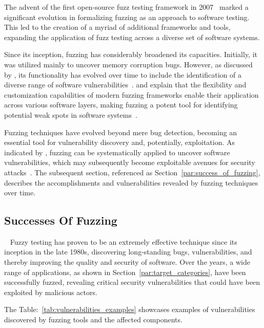 The advent of the first open-source fuzz testing framework in 2007~\cite{takanen2009fuzzing}
marked a significant evolution in formalizing fuzzing as an approach to software testing.
This led to the creation of a myriad of additional frameworks and tools, expanding the
application of fuzz testing across a diverse set of software systems.

Since its inception, fuzzing has considerably broadened its capacities.
Initially, it was utilized mainly to uncover memory corruption bugs. However,
as discussed by , its functionality has
evolved over time to include the identification of a diverse range of
software vulnerabilities~\cite{bohme2020fuzzing}.  and 
explain that the flexibility and customization capabilities of modern fuzzing
frameworks enable their application across various software layers,
making fuzzing a potent tool for identifying potential weak spots in
software systems~\cite{takanen2009fuzzing}.

Fuzzing techniques have evolved beyond mere bug detection, becoming an essential
tool for vulnerability discovery and, potentially, exploitation.
As indicated by \citeauthor{beaman2022fuzzing}, fuzzing can be
systematically applied to uncover software vulnerabilities, which
may subsequently become exploitable avenues for security
attacks~\cite{beaman2022fuzzing}. The subsequent section, referenced as
Section~\ref{par:success_of_fuzzing}, describes the accomplishments and
vulnerabilities revealed by fuzzing techniques over time.

\subsection{Successes Of Fuzzing}~\label{par:success_of_fuzzing}
Fuzzy testing has proven to be an extremely effective technique since its inception in the
late 1980s, discovering long-standing bugs, vulnerabilities, and thereby improving the
quality and security of software. Over the years, a wide range of applications,
as shown in Section~\ref{par:target_categories}, have been successfully fuzzed,
revealing critical security vulnerabilities that could have been exploited by malicious actors.

The Table:~\ref{tab:vulnerabilities_examples} showcases examples of vulnerabilities discovered by
fuzzing tools and the affected components.

